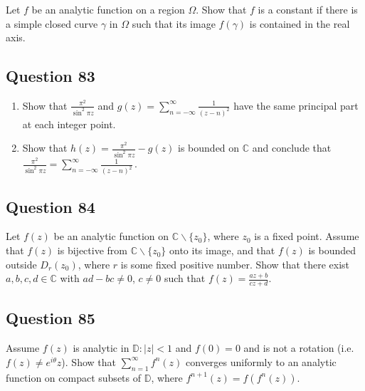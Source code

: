 \documentclass[12pt]{article}
\begin{document}
Let \(f\) be an analytic function on a region \(\Omega\). Show that
\(f\) is a constant if there is a simple closed curve \(\gamma\) in
\(\Omega\) such that its image \(f(\gamma)\) is contained in the real
axis.

\hypertarget{question-83-2}{%
\subsection{Question 83}\label{question-83-2}}

\begin{enumerate}
\def\labelenumi{(\arabic{enumi})}
\item
  Show that \(\displaystyle \frac{\pi^2}{\sin^2 \pi z}\) and
  \(\displaystyle g(z) = \sum_{n = - \infty}^{ \infty} \frac{1}{(z-n)^2}\)
  have the same principal part at each integer point.
\item
  Show that \(\displaystyle h(z) = \frac{\pi^2}{\sin^2 \pi z} - g(z)\)
  is bounded on \(\mathbb C\) and conclude that
  \(\displaystyle \frac{\pi^2}{\sin^2 \pi z} = \sum_{n = - \infty}^{ \infty} \frac{1}{(z-n)^2} \, .\)
\end{enumerate}

\hypertarget{question-84-2}{%
\subsection{Question 84}\label{question-84-2}}

Let \(f(z)\) be an analytic function on
\({\mathbb C} \backslash \{ z_0 \}\), where \(z_0\) is a fixed point.
Assume that \(f(z)\) is bijective from
\({\mathbb C} \backslash \{ z_0 \}\) onto its image, and that \(f(z)\)
is bounded outside \(D_r(z_0)\), where \(r\) is some fixed positive
number. Show that there exist \(a, b, c, d \in \mathbb C\) with
\(ad-bc \neq 0\), \(c \neq 0\) such that
\(\displaystyle f(z) = \frac{az + b}{cz + d}\).

\hypertarget{question-85-2}{%
\subsection{Question 85}\label{question-85-2}}

Assume \(f(z)\) is analytic in \(\mathbb D: |z|<1\) and \(f(0)=0\) and
is not a rotation (i.e.~\(f(z) \neq e^{i \theta} z\)). Show that
\(\displaystyle \sum_{n=1}^\infty f^{n}(z)\) converges uniformly to an
analytic function on compact subsets of \({\mathbb D}\), where
\(f^{n+1}(z) = f(f^{n}(z))\).
\end{document}
